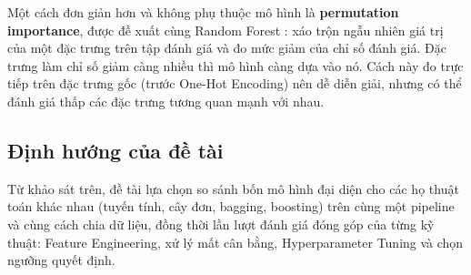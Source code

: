 Một cách đơn giản hơn và không phụ thuộc mô hình là \textbf{permutation importance}, được đề xuất cùng Random Forest \cite{breiman2001}: xáo trộn ngẫu nhiên giá trị của một đặc trưng trên tập đánh giá và đo mức giảm của chỉ số đánh giá. Đặc trưng làm chỉ số giảm càng nhiều thì mô hình càng dựa vào nó. Cách này đo trực tiếp trên đặc trưng gốc (trước One-Hot Encoding) nên dễ diễn giải, nhưng có thể đánh giá thấp các đặc trưng tương quan mạnh với nhau.

\subsection{Định hướng của đề tài}
Từ khảo sát trên, đề tài lựa chọn so sánh bốn mô hình đại diện cho các họ thuật toán khác nhau (tuyến tính, cây đơn, bagging, boosting) trên cùng một pipeline và cùng cách chia dữ liệu, đồng thời lần lượt đánh giá đóng góp của từng kỹ thuật: Feature Engineering, xử lý mất cân bằng, Hyperparameter Tuning và chọn ngưỡng quyết định.
